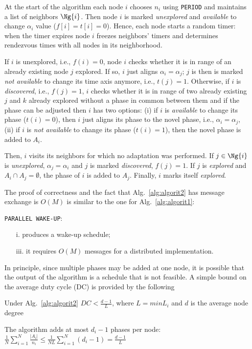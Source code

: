 At the start of the algorithm each node $i$ chooses $n_i$ using {\tt PERIOD} and maintains a list of neighbors 
$\Ng{i}$. Then node $i$ is marked {\em unexplored} and {\em available} to change $\alpha_i$ value ($f[i]=t[i]=0$). 
Hence, each node starts a random timer: when the timer expires node $i$ freezes neighbors' timers 
and determines rendezvous times with all nodes in its neighborhood.

If $i$ is unexplored, i.e., $f(i)=0$, node $i$ checks whether it is in range of an already existing 
node $j$ explored. If so, $i$ just aligns $\alpha_i=\alpha_j$; $j$ is then is marked {\em not available} 
to change its time axis anymore, i.e., $t(j)=1$. Otherwise, 
if $i$ is {\em discovered}, i.e., $f(j)=1$, $i$ checks whether it is in range of two already existing 
$j$ and $k$ already explored without a phase in common between them and if the phase can be adjusted then 
$i$ has two options: (i) if $i$ is {\em available} to change its phase ($t(i)=0$), then $i$ just aligns 
its phase to the novel phase, i.e., $\alpha_i=\alpha_j$, (ii) if $i$ is {\em not available} to 
change its phase ($t(i)=1$), then the novel phase is added to $A_i$.

Then, $i$ visits its neighbors for which no adaptation was performed. If $j\in \Ng{i}$ is {\em unexplored}, $\alpha_j=\alpha_i$ and $j$ is marked {\em discovered}, 
$f(j)=1$. If $j$ is {\em explored} and $A_i\cap A_j=\emptyset$, the phase of $i$ is added to $A_j$. Finally, $i$ marks 
itself {\em explored}.

The proof of correctness and the fact that Alg.~\ref{alg:algorit2} has message exchange 
is $O(M)$ is similar to the one for Alg.~\ref{alg:algorit1}:
\begin{thm}
{\tt PARALLEL WAKE-UP}:
\begin{enumerate}
\item[  i.] produces a wake-up schedule; 
\item[iii.] it requires $O(M)$ messages for a distributed implementation.
\end{enumerate}
\end{thm}

In principle, since multiple phases may be added at one node, it is possible that 
the output of the algorithm is a schedule that is not feasible. A simple bound on 
the average duty cycle (DC) is provided by the following
\begin{thm}
Under Alg.~\ref{alg:algorit2} $DC<\frac {d-1}{L}$, where $L=min L_i$ and $d$ is the average node degree
\end{thm}
\proof
The algorithm adds at most $d_i-1$ phases per node: $\frac 1N \sum_{i=1}^N \frac{|A_i|}{n_i}\leq \frac 1{NL}\sum_{i=1}^N (d_i-1)=\frac {d-1}{L}$
\endproof


